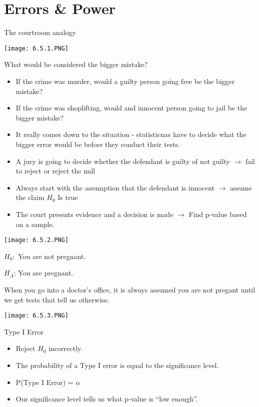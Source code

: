 \documentclass[../stats.tex]{subfiles}
\begin{document}
\section{Errors \& Power}
The courtroom analogy 
\begin{center}
    \texttt{[image: 6.5.1.PNG]}
\end{center}

What would be considered the bigger mistake?
\begin{itemize}
    \item If the crime was murder, would a guilty person going free be the bigger mistake?
    \item If the crime was shoplifting, would and innocent person going to jail be the bigger mistake?
    \item It really comes down to the situation - statisticnas have to decide what the bigger error would be before they conduct their tests.
\end{itemize}

\begin{itemize}
    \item A jury is going to decide whether the defendant is guilty of not guilty $\rightarrow$ fail to reject or reject the null 
    \item Always start with the assumption that the defendant is innocent $\rightarrow$ assume the claim $H_0$ Is true 
    \item The court presents evidence and a decision is made $\rightarrow$ Find p-value based on a sample.
\end{itemize}

\begin{center}
    \texttt{[image: 6.5.2.PNG]}
\end{center}

\begin{example}
    $H_0:$ You are not pregnant.

    $H_A$: You are pregnant.

    When you go into a doctor's office, it is always assumed you are not pregant until we get tests that tell us otherwise.
    \begin{center}
        \texttt{[image: 6.5.3.PNG]}
    \end{center}
\end{example}

Type I Error 
\begin{itemize}
    \item Reject $H_0$ incorrectly.
    \item The probability of a Type I error is equal to the significance level.
    \item P(Type I Error) = $\alpha$
    \item Our significance level tells us what p-value is ``low enough''.
\end{itemize}
\end{document}
